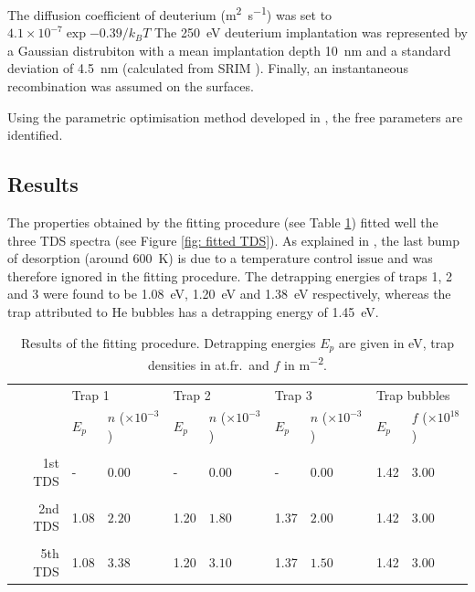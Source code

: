The diffusion coefficient of deuterium (\si{m^2.s^{-1}}) was set to $4.1\times 10 ^{-7} \exp{-0.39/k_B T}$ 
The \SI{250}{eV} deuterium implantation was represented by a Gaussian distrubiton with a mean implantation depth \SI{10}{nm} and a standard deviation of \SI{4.5}{nm} (calculated from SRIM ).
Finally, an instantaneous recombination was assumed on the surfaces.

Using the parametric optimisation method developed in , the free parameters are identified.

\subsection{Results}

The properties obtained by the fitting procedure (see Table \ref{tab: trap properties results}) fitted well the three TDS spectra (see Figure \ref{fig: fitted TDS}).
As explained in \cite{ialovega_hydrogen_2020}, the last bump of desorption (around \SI{600}{K}) is due to a temperature control issue and was therefore ignored in the fitting procedure.
The detrapping energies of traps 1, 2 and 3 were found to be \SI{1.08}{eV}, \SI{1.20}{eV} and \SI{1.38}{eV} respectively, whereas the trap attributed to He bubbles has a detrapping energy of \SI{1.45}{eV}.


\begin{table}[!h]
    \caption{Results of the fitting procedure. Detrapping energies $E_p$ are given in \si{eV}, trap densities in \si{at.fr.} and $f$ in \si{m^{-2}}.}
    \begin{tabular}{r l l l l l l l l}
    \\
    &\multicolumn{2}{l}{Trap 1}  & \multicolumn{2}{l}{Trap 2} & \multicolumn{2}{l}{Trap 3} &\multicolumn{2}{l}{Trap bubbles} \\
     & $E_p$ & $n$ ($\times 10 ^{-3}$) & $E_p$ & $n$ ($\times 10 ^{-3}$) & $E_p$ & $n$ ($\times 10 ^{-3}$) & $E_p$ & $f$ ($\times 10 ^{18}$) \\
    \\
    1st TDS & - & 0.00 & - & 0.00 & - & 0.00 & 1.42 & $3.00$ \\
    \\
    2nd TDS & 1.08 & $2.20$ & 1.20 & $1.80$ & 1.37 & $2.00$ & 1.42 & $3.00$ \\
    \\
    5th TDS & 1.08 & $3.38$ & 1.20 & $3.10$ & 1.37 & $1.50$ & 1.42 & $3.00$ \\
    \end{tabular}
    \label{tab: trap properties results}
\end{table}

